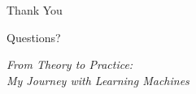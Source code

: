 \documentclass[aspectratio=169]{beamer}
\begin{document}
\begin{frame}
\begin{center}
\Huge Thank You

\vspace{1cm}

\Large Questions?

\vspace{1cm}

\normalsize
\textit{From Theory to Practice:\\
My Journey with Learning Machines}
\end{center}
\end{frame}
\end{document}
